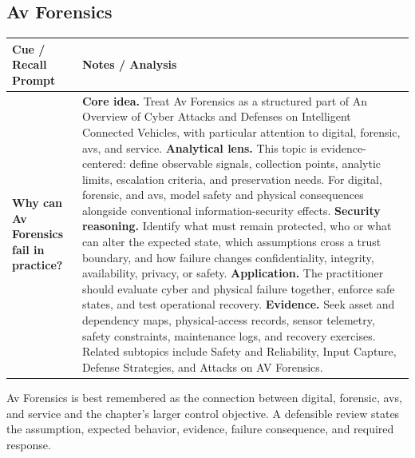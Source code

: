 \documentclass[11pt]{article}
\newcommand{\CornellHeader}{%
\rowcolor{Navy}\color{white}\bfseries Cue / Recall Prompt & \color{white}\bfseries Notes / Analysis\\\hline}
\newcommand{\CornellRow}[2]{%
\cellcolor{CueGray}\RaggedRight\textbf{#1} & \RaggedRight #2\\\hline}
\begin{document}
\subsection*{Av Forensics}
\begin{longtable}{>{\RaggedRight\arraybackslash}p{}|>{\RaggedRight\arraybackslash}p{}}
\CornellHeader
\CornellRow{Why can Av Forensics fail in practice?}{\textbf{Core idea.} Treat Av Forensics as a structured part of An Overview of Cyber Attacks and Defenses on Intelligent Connected Vehicles, with particular attention to digital, forensic, avs, and service. \textbf{Analytical lens.} This topic is evidence-centered: define observable signals, collection points, analytic limits, escalation criteria, and preservation needs. For digital, forensic, and avs, model safety and physical consequences alongside conventional information-security effects. \textbf{Security reasoning.} Identify what must remain protected, who or what can alter the expected state, which assumptions cross a trust boundary, and how failure changes confidentiality, integrity, availability, privacy, or safety. \textbf{Application.} The practitioner should evaluate cyber and physical failure together, enforce safe states, and test operational recovery. \textbf{Evidence.} Seek asset and dependency maps, physical-access records, sensor telemetry, safety constraints, maintenance logs, and recovery exercises. Related subtopics include Safety and Reliability, Input Capture, Defense Strategies, and Attacks on AV Forensics.}
\end{longtable}
\begin{topicsummary}
Av Forensics is best remembered as the connection between digital, forensic, avs, and service and the chapter's larger control objective. A defensible review states the assumption, expected behavior, evidence, failure consequence, and required response.
\end{topicsummary}
\end{document}
